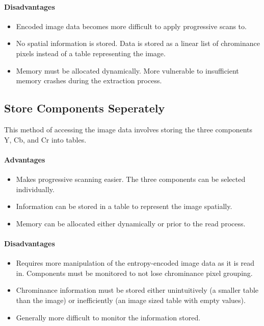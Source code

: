 \paragraph*{Disadvantages}
\begin{itemize}
	\item Encoded image data becomes more difficult to apply progressive scans to.
	\item No spatial information is stored. Data is stored as a linear list of chrominance pixels instead of a table representing the image.
	\item Memory must be allocated dynamically. More vulnerable to insufficient memory crashes during the extraction process.
\end{itemize}

\subsection*{Store Components Seperately}

This method of accessing the image data involves storing the three components Y, Cb, and Cr into tables.

\paragraph*{Advantages}
\begin{itemize}
	\item Makes progressive scanning easier. The three components can be selected individually.
	\item Information can be stored in a table to represent the image spatially.
	\item Memory can be allocated either dynamically or prior to the read process.
\end{itemize}

\paragraph*{Disadvantages}
\begin{itemize}
	\item Requires more manipulation of the entropy-encoded image data as it is read in. 
		Components must be monitored to not lose chrominance pixel grouping.
	\item Chrominance information must be stored either unintuitively (a smaller table than the image) or 
		inefficiently (an image sized table with empty values).
	\item Generally more difficult to monitor the information stored.
\end{itemize}